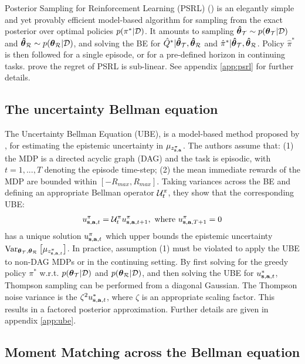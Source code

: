 \documentclass{article}
\begin{document}
Posterior Sampling for Reinforcement Learning (PSRL) (\cite{psrl}) is an elegantly simple and yet provably efficient model-based algorithm for sampling from the exact posterior over optimal policies $p(\pi^* | \mathcal{D})$. It amounts to sampling $\boldsymbol{\hat{\theta}}_{\mathcal{T}} \sim p(\boldsymbol{\theta}_{\mathcal{T}} | \mathcal{D})$ and $\boldsymbol{\hat{\theta}}_{\mathcal{R}} \sim p(\boldsymbol{\theta}_{\mathcal{R}} | \mathcal{D})$, and solving the BE for $\hat{Q}^* | \boldsymbol{\hat{\theta}}_{\mathcal{T}}, \boldsymbol{\hat{\theta}}_{\mathcal{R}} $ and $\hat{\pi}^* | \boldsymbol{\hat{\theta}}_{\mathcal{T}}, \boldsymbol{\hat{\theta}}_{\mathcal{R}}$. Policy $\hat{\pi}^*$ is then followed for a single episode, or for a pre-defined horizon in continuing tasks. \cite{psrl} prove the regret of PSRL is sub-linear. See appendix \ref{app:psrl} for further details.

\subsection{The uncertainty Bellman equation}
The Uncertainty Bellman Equation (UBE), is a model-based method proposed by \cite{ube}, for estimating the epistemic uncertainty in $\mu_{z^\pi_{\mathbf{s}, \mathbf{a}}}$. The authors assume that: (1) the MDP is a directed acyclic graph (DAG) and the task is episodic, with $t = 1, ..., T$ denoting the episode time-step; (2) the mean immediate rewards of the MDP are bounded within $[-R_{max}, R_{max}]$. Taking variances across the BE and defining an appropriate Bellman operator $\mathcal{U}^\pi_t$, they show that the corresponding UBE:
\begin{gather*}
u_{\mathbf{s}, \mathbf{a}, t}^\pi = \mathcal{U}^\pi_{t} u_{\mathbf{s}, \mathbf{a}, t + 1}^\pi,\text{ where } u_{\mathbf{s}, \mathbf{a}, T + 1}^\pi = 0
\end{gather*}
has a unique solution $u_{\mathbf{s}, \mathbf{a}, t}^\pi$ which upper bounds the epistemic uncertainty $\operatorname{\text{Var}}_{\boldsymbol{\theta}_{\mathcal{T}}, \boldsymbol{\theta}_{\mathcal{R}}} \big[ \mu_{z^{\pi}_{\mathbf{s}, \mathbf{a}, t}} \big]$. In practice, assumption (1) must be violated to apply the UBE to non-DAG MDPs or in the continuing setting. By first solving for the greedy policy ${\pi^*}$ w.r.t. $p(\boldsymbol{\theta}_{\mathcal{T}} | \mathcal{D})$ and $p(\boldsymbol{\theta}_{\mathcal{R}} | \mathcal{D})$, and then solving the UBE for $u_{\mathbf{s}, \mathbf{a}, t}^{*}$, Thompson sampling can be performed from a diagonal Gaussian. The Thompson noise variance is the $\zeta^2 u_{\mathbf{s}, \mathbf{a}, t}^{*}$, where $\zeta$ is an appropriate scaling factor. This results in a factored posterior approximation. Further details are given in appendix \ref{app:ube}.

\subsection{Moment Matching across the Bellman equation}
\end{document}
